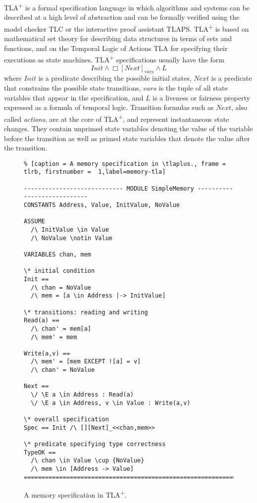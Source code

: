 \documentclass{thesul}
\newcommand{\tlaplus}{TLA\textsuperscript{+}\xspace}
\begin{document}
\tlaplus is a formal specification language in which algorithms and systems can be described at a high level of abstraction and can be formally verified using the model checker TLC or the interactive proof assistant TLAPS. \tlaplus is based on mathematical set theory for describing data structures in terms of sets and functions, and on the Temporal Logic of Actions TLA for specifying their executions as state machines. \tlaplus specifications usually have the form
\[
  Init \land \Box[Next]_{vars} \land L
\]
where $Init$ is a predicate describing the possible initial states, $Next$ is a predicate that constrains the possible state transitions, $vars$ is the tuple of all state variables that appear in the specification, and $L$ is a liveness or fairness property expressed as a formula of temporal logic. Transition formulas such as $Next$, also called \emph{actions}, are at the core of \tlaplus, and represent instantaneous state changes. They contain unprimed state variables denoting the value of the variable before the transition as well as primed state variables that denote the value after the transition.

\begin{figure}
\begin{lstlisting}% [caption = A memory specification in \tlaplus., frame = tlrb, firstnumber =  1,label=memory-tla]

---------------------------- MODULE SimpleMemory ----------------------------
CONSTANTS Address, Value, InitValue, NoValue

ASSUME 
  /\ InitValue \in Value
  /\ NoValue \notin Value

VARIABLES chan, mem

\* initial condition
Init == 
  /\ chan = NoValue
  /\ mem = [a \in Address |-> InitValue]

\* transitions: reading and writing
Read(a) == 
  /\ chan' = mem[a]
  /\ mem' = mem

Write(a,v) ==
  /\ mem' = [mem EXCEPT ![a] = v]
  /\ chan' = NoValue

Next ==
  \/ \E a \in Address : Read(a)
  \/ \E a \in Address, v \in Value : Write(a,v)

\* overall specification
Spec == Init /\ [][Next]_<<chan,mem>>

\* predicate specifying type correctness
TypeOK == 
  /\ chan \in Value \cup {NoValue}
  /\ mem \in [Address -> Value] 
=============================================================================
\end{lstlisting}
\caption{A memory specification in \tlaplus.}
\label{memory-tla}
\end{figure}
\end{document}
